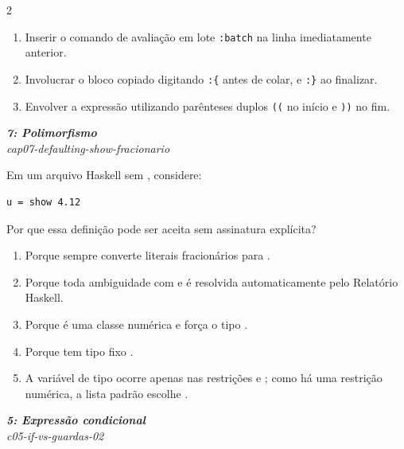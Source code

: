 \documentclass[a4paper,10pt,brazil]{article}
\begin{document}
\begin{multicols}{2}
\begin{enumerate}
  \item Inserir o comando de avaliação em lote \texttt{:batch} na linha imediatamente anterior.

  \item Involucrar o bloco copiado digitando \texttt{:\{} antes de colar, e \texttt{:\}} ao finalizar.

  \item Envolver a expressão utilizando parênteses duplos \texttt{((} no início e \texttt{))} no fim.


\end{enumerate}

\begin{flushright}
  \footnotesize
  \textit{\textbf{7: Polimorfismo}}\\
  \textit{cap07-defaulting-show-fracionario}\\

\end{flushright}
Em um arquivo Haskell sem , considere:

\begin{verbatim}
u = show 4.12
\end{verbatim}

Por que essa definição pode ser aceita sem assinatura explícita?

\begin{enumerate}
  \item Porque  sempre converte literais fracionários para .
  \item Porque toda ambiguidade com  e  é resolvida automaticamente pelo Relatório Haskell.
  \item Porque  é uma classe numérica e força o tipo .
  \item Porque  tem tipo fixo .
  \item A variável de tipo ocorre apenas nas restrições  e ; como há uma restrição numérica, a lista padrão escolhe .

\end{enumerate}

\begin{flushright}
  \footnotesize
  \textit{\textbf{5: Expressão condicional}}\\
  \textit{c05-if-vs-guardas-02}\\


\end{flushright}
\end{multicols}
\end{document}
